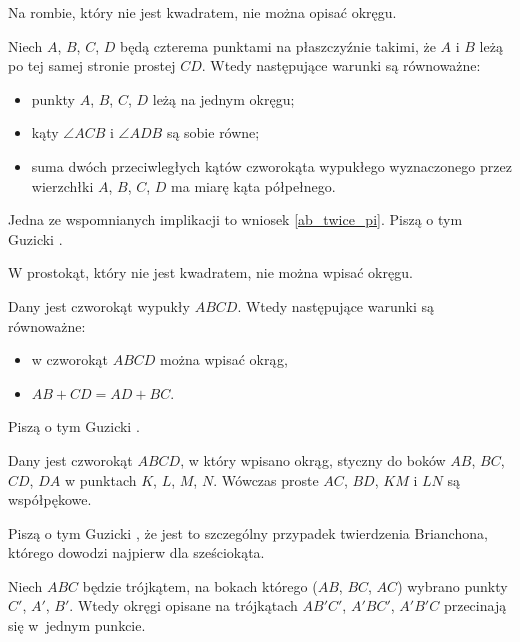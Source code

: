 
Na rombie, który nie jest kwadratem, nie można opisać okręgu.

\begin{proposition}
%
\label{prp_incircle}
	Niech $A$, $B$, $C$, $D$ będą czterema punktami na płaszczyźnie takimi, że $A$ i $B$ leżą po tej samej stronie prostej $CD$.
	Wtedy następujące warunki są równoważne:
	\begin{itemize}
		\item punkty $A$, $B$, $C$, $D$ leżą na jednym okręgu;
		\item kąty $\angle ACB$ i $\angle ADB$ są sobie równe;
		\item suma dwóch przeciwległych kątów czworokąta wypukłego wyznaczonego przez wierzchłki $A$, $B$, $C$, $D$ ma miarę kąta półpełnego.
	\end{itemize}
\end{proposition}

Jedna ze wspomnianych implikacji to wniosek \ref{ab_twice_pi}.
Piszą o tym Guzicki \cite[s. 11-13, 16, 17]{guzicki_2021}.

W prostokąt, który nie jest kwadratem, nie można wpisać okręgu.

\begin{proposition}
	\label{prp_excircle}
	Dany jest czworokąt wypukły $ABCD$.
	Wtedy następujące warunki są równoważne:
	\begin{itemize}
		\item w czworokąt $ABCD$ można wpisać okrąg,
		\item $AB + CD = AD + BC$.
	\end{itemize}
\end{proposition}

Piszą o tym Guzicki \cite[s. 231-237]{guzicki_2021}.

\begin{proposition}
	Dany jest czworokąt $ABCD$, w który wpisano okrąg, styczny do boków $AB$, $BC$, $CD$, $DA$ w punktach $K$, $L$, $M$, $N$.
	Wówczas proste $AC$, $BD$, $KM$ i $LN$ są współpękowe.
\end{proposition}

Piszą o tym Guzicki \cite[s. 237, 238]{guzicki_2021}, że jest to szczególny przypadek twierdzenia Brianchona, którego dowodzi najpierw dla sześciokąta.

\begin{proposition}
	Niech $ABC$ będzie trójkątem, na bokach którego ($AB$, $BC$, $AC$) wybrano punkty $C'$, $A'$, $B'$.
	Wtedy okręgi opisane na trójkątach $AB'C'$, $A'BC'$, $A'B'C$ przecinają się w~jednym punkcie.
\end{proposition}

